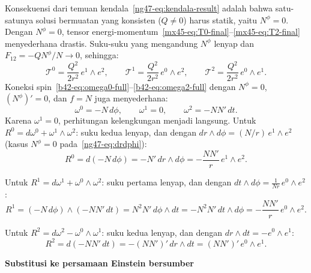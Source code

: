 Konsekuensi dari temuan kendala~\eqref{ng47-eq:kendala-result} adalah bahwa satu-satunya solusi bermuatan yang konsisten ($Q \neq 0$) harus statik, yaitu $N^\phi = 0$. Dengan $N^\phi = 0$, tensor energi-momentum~\eqref{mx45-eq:T0-final}--\eqref{mx45-eq:T2-final} menyederhana drastis. Suku-suku yang mengandung $N^\phi$ lenyap dan $F_{12} = -QN^\phi/N \to 0$, sehingga:
\begin{equation}\label{ng47-eq:T-static}
    \mathcal{T}^0 = \frac{Q^2}{2r^2}\,e^1 \wedge e^2, \qquad
    \mathcal{T}^1 = \frac{Q^2}{2r^2}\,e^0 \wedge e^2, \qquad
    \mathcal{T}^2 = \frac{Q^2}{2r^2}\,e^0 \wedge e^1.
\end{equation}
Koneksi spin~\eqref{b42-eq:omega0-full}--\eqref{b42-eq:omega2-full} dengan $N^\phi = 0$, $(N^\phi)' = 0$, dan $f = N$ juga menyederhana:
\begin{equation}\label{ng47-eq:omega-static}
    \omega^0 = -N\,d\phi, \qquad \omega^1 = 0, \qquad \omega^2 = -NN'\,dt.
\end{equation}
Karena $\omega^1 = 0$, perhitungan kelengkungan menjadi langsung. Untuk $R^0 = d\omega^0 + \omega^1 \wedge \omega^2$: suku kedua lenyap, dan dengan $dr \wedge d\phi = (N/r)\,e^1 \wedge e^2$ (kasus $N^\phi = 0$ pada~\eqref{ng47-eq:drdphi}):
\begin{equation}\label{ng47-eq:R0-static}
    R^0 = d(-N\,d\phi) = -N'\,dr \wedge d\phi = -\frac{NN'}{r}\,e^1 \wedge e^2.
\end{equation}

\noindent Untuk $R^1 = d\omega^1 + \omega^0 \wedge \omega^2$: suku pertama lenyap, dan dengan $dt \wedge d\phi = \frac{1}{Nr}\,e^0 \wedge e^2$:
\begin{equation}\label{ng47-eq:R1-static}
    R^1 = (-N\,d\phi) \wedge (-NN'\,dt) = N^2N'\,d\phi \wedge dt = -N^2N'\,dt \wedge d\phi = -\frac{NN'}{r}\,e^0 \wedge e^2.
\end{equation}

\noindent Untuk $R^2 = d\omega^2 - \omega^0 \wedge \omega^1$: suku kedua lenyap, dan dengan $dr \wedge dt = -e^0 \wedge e^1$:
\begin{equation}\label{ng47-eq:R2-static}
    R^2 = d(-NN'\,dt) = -(NN')'\,dr \wedge dt = (NN')'\,e^0 \wedge e^1.
\end{equation}

\vspace{0.5em}
\noindent \textbf{Substitusi ke persamaan Einstein bersumber}


